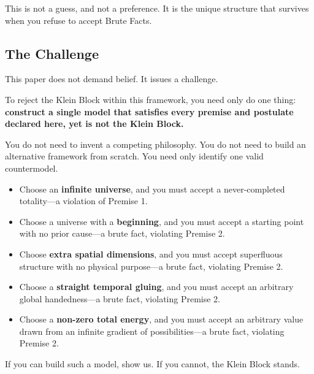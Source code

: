 \documentclass[11pt]{article}
\theoremstyle{canonstyle}
\begin{document}
This is not a guess, and not a preference. It is the unique structure that survives when you refuse to accept Brute Facts.

\subsection{The Challenge}

This paper does not demand belief. It issues a challenge.

To reject the Klein Block within this framework, you need only do one thing: \textbf{construct a single model that satisfies every premise and postulate declared here, yet is not the Klein Block.}

You do not need to invent a competing philosophy. You do not need to build an alternative framework from scratch. You need only identify one valid countermodel.

\begin{itemize}
    \item Choose an \textbf{infinite universe}, and you must accept a never-completed totality---a violation of Premise 1.
    \item Choose a universe with a \textbf{beginning}, and you must accept a starting point with no prior cause---a brute fact, violating Premise 2.
    \item Choose \textbf{extra spatial dimensions}, and you must accept superfluous structure with no physical purpose---a brute fact, violating Premise 2.
    \item Choose a \textbf{straight temporal gluing}, and you must accept an arbitrary global handedness---a brute fact, violating Premise 2.
    \item Choose a \textbf{non-zero total energy}, and you must accept an arbitrary value drawn from an infinite gradient of possibilities---a brute fact, violating Premise 2.
\end{itemize}

If you can build such a model, show us. If you cannot, the Klein Block stands.

\bigskip
\end{document}
